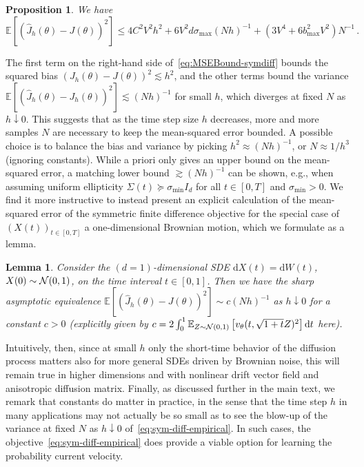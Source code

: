 \documentclass[oneside,11pt]{article}
\newtheorem{proposition}{Proposition}
\newtheorem{lemma}{Lemma}
\theoremstyle{remark}
\begin{document}
\begin{proposition} \label{prop:mse-sym-diff}
We have
\begin{equation}\label{eq:MSEBound-symdiff}
\mathbb{E}\left[(\widehat{J}_h(\theta) - J(\theta))^2\right] \leq 4 C^2 V^2 h^2 + 6 V^2 d \sigma_{\max} (N h)^{-1} + \left(3V^4 + 6 b_{\max}^2 V^2 \right) N^{-1}\,.
\end{equation}
\end{proposition}
The first term on the right-hand side of~\eqref{eq:MSEBound-symdiff} bounds the squared bias $(J_{h}(\theta) - J(\theta))^2 \lesssim h^2$, and the other terms bound the variance $\mathbb{E} \left[(\widehat{J}_{h}(\theta) - J_{h}(\theta))^2 \right] \lesssim (Nh)^{-1}$ for small $h$, which diverges at fixed $N$ as $h \downarrow 0$. This suggests that as the time step size $h$ decreases, more and more samples $N$ are necessary to keep the mean-squared error bounded. A possible choice is to balance the bias and variance by picking $h^2 \approx (Nh)^{-1}$, or $N \approx 1 / h^3$ (ignoring constants). While  a priori only gives an upper bound on the mean-squared error, a matching lower bound $\gtrsim (Nh)^{-1}$ can be shown, e.g., when assuming uniform ellipticity $\Sigma(t) \succeq \sigma_{\min}I_d$ for all $t \in [0,T]$ and $\sigma_{\min} > 0$. We find it more instructive to instead present an explicit calculation of the mean-squared error of the symmetric finite difference objective for the special case of $(X(t))_{t \in [0,T]}$ a one-dimensional Brownian motion, which we formulate as a lemma.

\begin{lemma}\label{lemma:1d-bm-error}
    Consider the $(d = 1)$-dimensional SDE $\mathrm{d}X(t) = \mathrm{d} W(t)$, $X(0) \sim {\cal N}(0,1)$, on the time interval $t \in [0,1]$. Then we have the sharp asymptotic equivalence $\mathbb{E}\left[(\widehat{J}_h(\theta) - J(\theta))^2\right] \sim c (Nh)^{-1}$ as $h \downarrow 0$ for a constant $c > 0$ (explicitly given by $c = 2 \int_0^1 \mathbb{E}_{Z \sim {\cal N}(0,1)}\left[v_\theta(t, \sqrt{1 + t} Z)^2 \right] \mathrm{d}t$ here).
\end{lemma}

Intuitively, then, since at small $h$ only the short-time behavior of
the diffusion process matters also for more general SDEs driven by Brownian
noise, this will remain true in higher dimensions and with nonlinear drift
vector field and anisotropic diffusion matrix. Finally, as discussed further in the main text, we remark that constants do matter in practice, in the sense that the time step $h$ in many applications may not actually be so small as to see the blow-up of the variance at fixed $N$ as $h \downarrow 0$ of~\eqref{eq:sym-diff-empirical}. In such cases, the objective~\eqref{eq:sym-diff-empirical} does provide a viable option for learning the probability current velocity.
\end{document}
